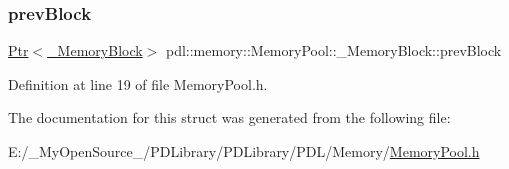 \subsubsection{\texorpdfstring{prevBlock}{prevBlock}}
{\footnotesize\ttfamily \mbox{\hyperlink{classpdl_1_1memory_1_1_ptr}{Ptr}}$<$\mbox{\hyperlink{structpdl_1_1memory_1_1_memory_pool_1_1___memory_block}{\+\_\+\+Memory\+Block}}$>$ pdl\+::memory\+::\+Memory\+Pool\+::\+\_\+\+Memory\+Block\+::prev\+Block}



Definition at line 19 of file Memory\+Pool.\+h.



The documentation for this struct was generated from the following file\+:\begin{DoxyCompactItemize}
\item 
E\+:/\+\_\+\+My\+Open\+Source\+\_\+/\+P\+D\+Library/\+P\+D\+Library/\+P\+D\+L/\+Memory/\mbox{\hyperlink{_memory_pool_8h}{Memory\+Pool.\+h}}\end{DoxyCompactItemize}
